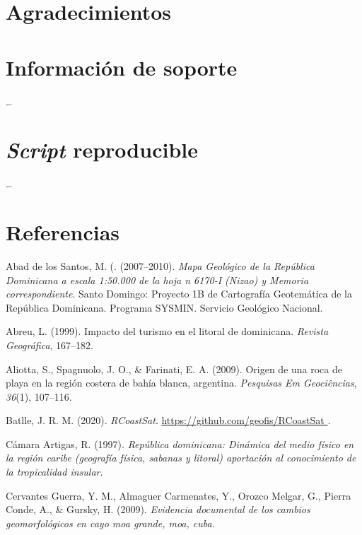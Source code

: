 \documentclass[11pt,]{article}
\begin{document}
\section{Agradecimientos}\label{agradecimientos}

\section{Información de soporte}\label{informaciuxf3n-de-soporte}

\ldots

\section{\texorpdfstring{\emph{Script}
reproducible}{Script reproducible}}\label{script-reproducible}

\ldots

\section*{Referencias}\label{referencias}

\hypertarget{refs}{}
\hypertarget{ref-abad2007mapageonizao}{}
Abad de los Santos, M. (. (2007--2010). \emph{Mapa Geológico de la
República Dominicana a escala 1:50.000 de la hoja n 6170-I (Nizao) y
Memoria correspondiente}. Santo Domingo: Proyecto 1B de Cartografía
Geotemática de la República Dominicana. Programa SYSMIN. Servicio
Geológico Nacional.

\hypertarget{ref-abreu1999impacto}{}
Abreu, L. (1999). Impacto del turismo en el litoral de dominicana.
\emph{Revista Geográfica}, 167--182.

\hypertarget{ref-aliotta2009origen}{}
Aliotta, S., Spagnuolo, J. O., \& Farinati, E. A. (2009). Origen de una
roca de playa en la región costera de bahía blanca, argentina.
\emph{Pesquisas Em Geociências}, \emph{36}(1), 107--116.

\hypertarget{ref-rcoastsat}{}
Batlle, J. R. M. (2020). \emph{RCoastSat}.
\href{\%0Ahttps://github.com/geofis/RCoastSat\%0A}{
https://github.com/geofis/RCoastSat
}.

\hypertarget{ref-camara1997republica}{}
Cámara Artigas, R. (1997). \emph{República dominicana: Dinámica del
medio físico en la región caribe (geografía física, sabanas y litoral)
aportación al conocimiento de la tropicalidad insular}.

\hypertarget{ref-cervantes2009evidencia}{}
Cervantes Guerra, Y. M., Almaguer Carmenates, Y., Orozco Melgar, G.,
Pierra Conde, A., \& Gursky, H. (2009). \emph{Evidencia documental de
los cambios geomorfológicos en cayo moa grande, moa, cuba.}
\end{document}
